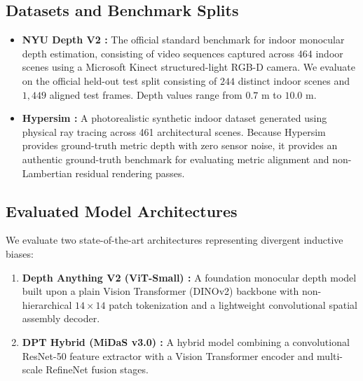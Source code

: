 \documentclass[11pt,a4paper]{article}
\begin{document}
\subsection{Datasets and Benchmark Splits}
\begin{itemize}
    \item \textbf{NYU Depth V2 \citep{silberman2012indoor}:} The official standard benchmark for indoor monocular depth estimation, consisting of video sequences captured across 464 indoor scenes using a Microsoft Kinect structured-light RGB-D camera. We evaluate on the official held-out test split consisting of $244$ distinct indoor scenes and $1,449$ aligned test frames. Depth values range from $0.7\text{ m}$ to $10.0\text{ m}$.
    \item \textbf{Hypersim \citep{roberts2021hypersim}:} A photorealistic synthetic indoor dataset generated using physical ray tracing across 461 architectural scenes. Because Hypersim provides ground-truth metric depth with zero sensor noise, it provides an authentic ground-truth benchmark for evaluating metric alignment and non-Lambertian residual rendering passes.
\end{itemize}

\subsection{Evaluated Model Architectures}
We evaluate two state-of-the-art architectures representing divergent inductive biases:
\begin{enumerate}
    \item \textbf{Depth Anything V2 (ViT-Small) \citep{yang2024depthanythingv2}:} A foundation monocular depth model built upon a plain Vision Transformer (DINOv2) backbone with non-hierarchical $14 \times 14$ patch tokenization and a lightweight convolutional spatial assembly decoder.
    \item \textbf{DPT Hybrid (MiDaS v3.0) \citep{ranftl2021vision,ranftl2022towards}:} A hybrid model combining a convolutional ResNet-50 feature extractor with a Vision Transformer encoder and multi-scale RefineNet fusion stages.
\end{enumerate}
\end{document}
